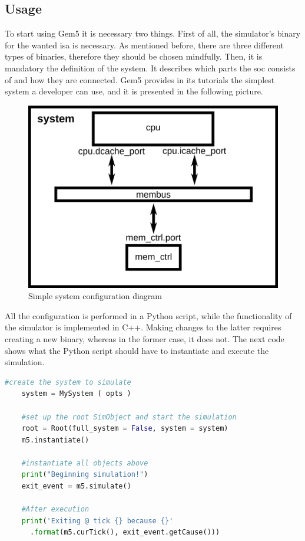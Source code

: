
\subsection{Usage}

To start using Gem5 it is necessary two things. First of all, the simulator's binary for the wanted \gls{isa} is necessary. As mentioned before, 
there are three different types of binaries, therefore they should be chosen mindfully. Then, it is mandatory the definition of the system. 
It describes which parts the \gls{soc} consists of and how they are connected. Gem5 provides in its tutorials the simplest system a developer 
can use, and it is presented in the following picture.

\begin{figure}[H]
	\centering
 	\includegraphics[width=0.5\linewidth]{Images/simple_config.png}
 	\caption{Simple system configuration diagram}
	 \label{fig_simple_config}
\end{figure}

All the configuration is performed in a Python script, while the functionality of the simulator is implemented in C++. Making changes to the 
latter requires creating a new binary, whereas in the former case, it does not. The next code shows what the Python script should have to 
instantiate and execute the simulation. 

\begin{lstlisting}[language=Python, caption=Script to instantiate and execute the simulation]
    #create the system to simulate
    system = MySystem ( opts )

    #set up the root SimObject and start the simulation
    root = Root(full_system = False, system = system)
    m5.instantiate()

    #instantiate all objects above
    print("Beginning simulation!")
    exit_event = m5.simulate()

    #After execution
    print('Exiting @ tick {} because {}'
      .format(m5.curTick(), exit_event.getCause()))

\end{lstlisting}

